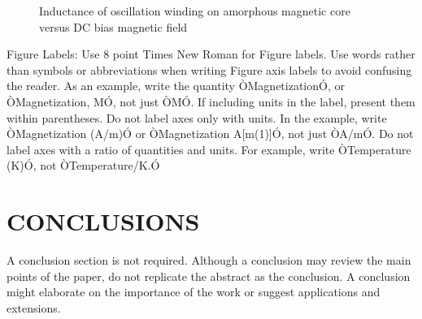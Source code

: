 \documentclass[letterpaper, 10 pt, conference]{ieeeconf}  %
\begin{document}
   \begin{figure}[thpb]
      \centering
      \caption{Inductance of oscillation winding on amorphous
       magnetic core versus DC bias magnetic field}
      \label{figurelabel}
   \end{figure}
   

Figure Labels: Use 8 point Times New Roman for Figure labels. Use words rather than symbols or abbreviations when writing Figure axis labels to avoid confusing the reader. As an example, write the quantity ÒMagnetizationÓ, or ÒMagnetization, MÓ, not just ÒMÓ. If including units in the label, present them within parentheses. Do not label axes only with units. In the example, write ÒMagnetization (A/m)Ó or ÒMagnetization {A[m(1)]}Ó, not just ÒA/mÓ. Do not label axes with a ratio of quantities and units. For example, write ÒTemperature (K)Ó, not ÒTemperature/K.Ó

\section{CONCLUSIONS}

A conclusion section is not required. Although a conclusion may review the main points of the paper, do not replicate the abstract as the conclusion. A conclusion might elaborate on the importance of the work or suggest applications and extensions. 

\addtolength{\textheight}{-12cm}   %




\end{document}
